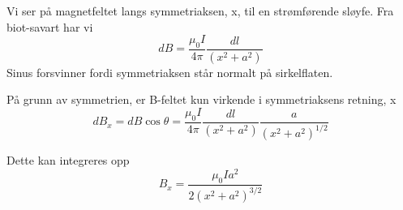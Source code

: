Vi ser på magnetfeltet langs symmetriaksen, x, til en strømførende sløyfe.
Fra biot-savart har vi
$$dB = \frac{\mu_0 I}{4\pi} \frac{dl}{(x^2 + a^2)}$$
Sinus forsvinner fordi symmetriaksen står normalt på sirkelflaten.

På grunn av symmetrien, er B-feltet kun virkende i symmetriaksens retning, x
$$dB_x = dB\cos{\theta}
       = \frac{\mu_0 I}{4\pi} \frac{dl}{(x^2+a^2)} \frac{a}{(x^2+a^2)^{1/2}}$$

Dette kan integreres opp
$$B_x = \frac{\mu_0 I a^2}{2(x^2+a^2)^{3/2}}$$
